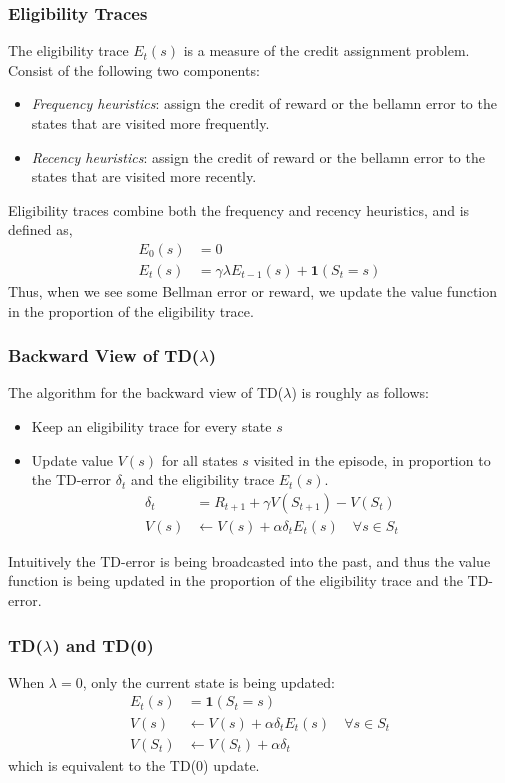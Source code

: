\subsubsection{Eligibility Traces}
The eligibility trace \(E_t(s)\) is a measure of the credit assignment problem. 
Consist of the following two components:
\begin{itemize}
    \item \emph{Frequency heuristics}: assign the credit of reward or the bellamn error to
    the states that are visited more frequently.
    \item \emph{Recency heuristics}: assign the credit of reward or the bellamn error to
    the states that are visited more recently.
\end{itemize}
Eligibility traces combine both the frequency and recency heuristics, and is defined as,
\[
    \begin{aligned}
        E_0(s) &= 0 \\
        E_t(s) &= \gamma\lambda E_{t-1}(s) + \bm{1}(S_t = s)      
    \end{aligned}
\]
Thus, when we see some Bellman error or reward, we update the value function in the proportion
of the eligibility trace. 


\subsubsection{Backward View of TD(\(\lambda \))}
The algorithm for the backward view of TD(\(\lambda \)) is roughly as follows:
\begin{itemize}
    \item Keep an eligibility trace for every state \(s\)
    \item Update value \(V(s)\) for all states \(s\) visited in the episode, 
    in proportion to the TD-error \(\delta_t\) and the eligibility trace \(E_t(s)\).
    \[
        \begin{aligned}
            \delta _t &= R_{t+1} + \gamma V(S_{t+1}) - V(S_t) \\
            V(s) &\leftarrow V(s) + \alpha\delta_t E_t(s) \quad \forall s \in S_t
        \end{aligned}
    \] 
\end{itemize}
Intuitively the TD-error is being broadcasted into the past, and thus the value function is being
updated in the proportion of the eligibility trace and the TD-error. 

\subsubsection*{TD(\(\lambda \)) and TD(0)}
When \(\lambda = 0\), only the current state is being updated:
\[
    \begin{aligned}
        E_t(s) &= \bm{1}(S_t = s) \\
        V(s) &\leftarrow V(s) + \alpha\delta_t E_t(s) \quad \forall s \in S_t \\
        V(S_t) &\leftarrow V(S_t) + \alpha\delta_t
    \end{aligned}  
\]
which is equivalent to the TD(0) update.


